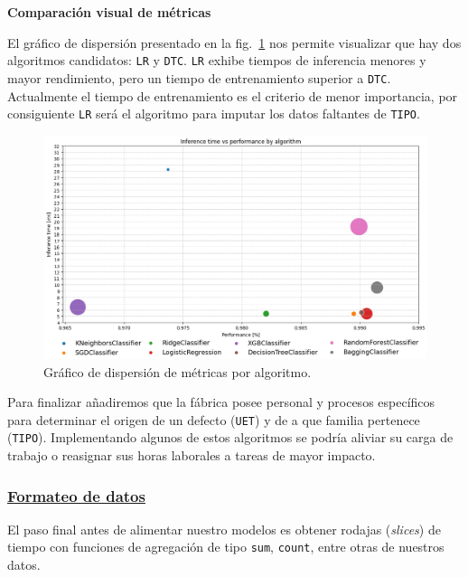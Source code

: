 \documentclass[a4paper,12pt]{article}
\begin{document}
		\textbf{Comparación visual de métricas}
						
		El gráfico de dispersión presentado en la fig.~\ref{fig:inference_training_perfo_uet} nos permite visualizar que hay dos algoritmos candidatos: \texttt{LR} y \texttt{DTC}. \texttt{LR} exhibe tiempos de inferencia menores y mayor rendimiento, pero un tiempo de entrenamiento superior a \texttt{DTC}. Actualmente el tiempo de entrenamiento es el criterio de menor importancia, por consiguiente \texttt{LR} será el algoritmo para imputar los datos faltantes de \texttt{TIPO}.
						
		\begin{figure}[H]
			\begin{center}
				\includegraphics[width=1\textwidth]{inference_training_perfo_uet.png}
				\caption{Gráfico de dispersión de métricas por algoritmo.}
				\label{fig:inference_training_perfo_uet}
			\end{center}
		\end{figure}
						
		Para finalizar añadiremos que la fábrica posee personal y procesos específicos para determinar el origen de un defecto (\texttt{UET}) y de a que familia pertenece (\texttt{TIPO}). Implementando algunos de estos algoritmos se podría aliviar su carga de trabajo o  reasignar sus horas laborales a tareas de mayor impacto.
						
		\subsubsection{\href{https://github.com/GeraCollante/tesis-icomp-machinelearning/blob/main/DataFormatting.ipynb}{\color{blue}Formateo de datos}}\label{DataFormatting}
						
		El paso final antes de alimentar nuestro modelos es obtener rodajas (\textit{slices}) de tiempo con funciones de agregación de tipo \texttt{sum}, \texttt{count}, entre otras de nuestros datos. 
						
\end{document}
